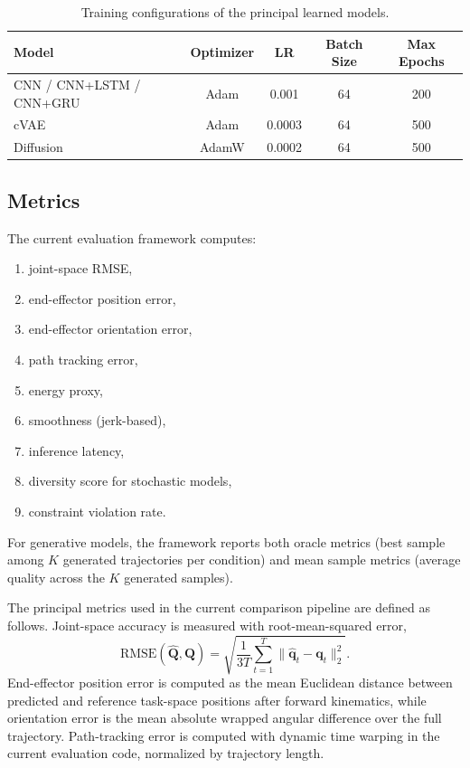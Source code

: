 \documentclass[11pt]{article}
\begin{document}
\begin{table}[h]
\centering
\caption{Training configurations of the principal learned models.}
\label{tab:training_config}
\begin{tabular}{lcccc}
\toprule
Model & Optimizer & LR & Batch Size & Max Epochs \\
\midrule
CNN / CNN+LSTM / CNN+GRU & Adam & 0.001 & 64 & 200 \\
cVAE & Adam & 0.0003 & 64 & 500 \\
Diffusion & AdamW & 0.0002 & 64 & 500 \\
\bottomrule
\end{tabular}
\end{table}

\subsection{Metrics}

The current evaluation framework computes:
\begin{enumerate}[leftmargin=1.5em]
    \item joint-space RMSE,
    \item end-effector position error,
    \item end-effector orientation error,
    \item path tracking error,
    \item energy proxy,
    \item smoothness (jerk-based),
    \item inference latency,
    \item diversity score for stochastic models,
    \item constraint violation rate.
\end{enumerate}

For generative models, the framework reports both oracle metrics (best sample among $K$ generated trajectories per condition) and mean sample metrics (average quality across the $K$ generated samples).

The principal metrics used in the current comparison pipeline are defined as follows. Joint-space accuracy is measured with root-mean-squared error,
\begin{equation}
    \mathrm{RMSE}(\hat{\mathbf{Q}}, \mathbf{Q})
    =
    \sqrt{\frac{1}{3T}\sum_{t=1}^{T}\|\hat{\mathbf{q}}_t - \mathbf{q}_t\|_2^2 }.
\end{equation}
End-effector position error is computed as the mean Euclidean distance between predicted and reference task-space positions after forward kinematics, while orientation error is the mean absolute wrapped angular difference over the full trajectory. Path-tracking error is computed with dynamic time warping in the current evaluation code, normalized by trajectory length.
\end{document}

